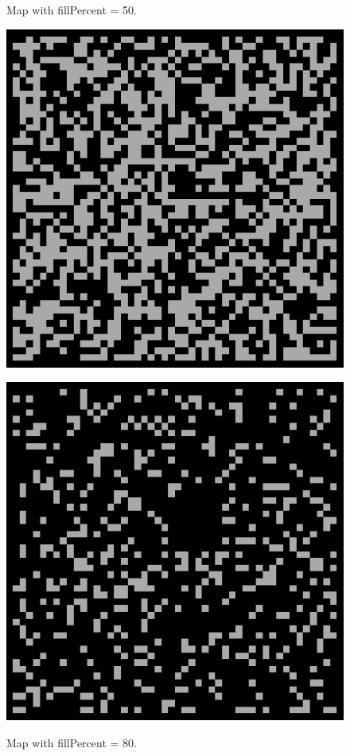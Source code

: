 \begin{figure}[h]
  \centering
  \begin{minipage}[b]{0.4\textwidth}
    \caption{Map with fillPercent = 50.}
    \includegraphics[width=\textwidth]{images/development/50_filled.png}
    \label{fig:fillper50}
  \end{minipage}
  \hfill
  \begin{minipage}[b]{0.4\textwidth}
    \caption{Map with fillPercent = 80.}
    \includegraphics[width=\textwidth]{images/development/80_filled.png}
    \label{fig:fillper80}
  \end{minipage}
\end{figure}

